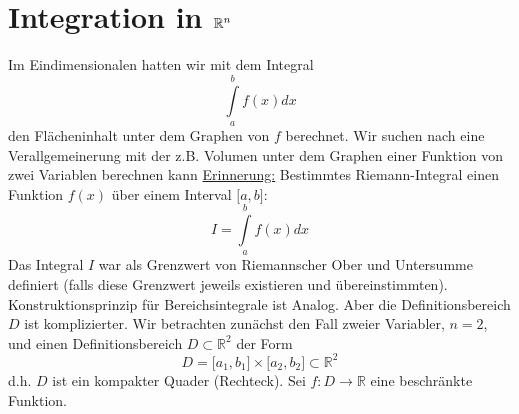 \chapter{Integration in $\mathbb{R}^{\lowercase{n}}$}
Im Eindimensionalen hatten wir mit dem Integral \[\int\limits_a^b f(x)dx\] den Flächeninhalt unter dem Graphen von $f$ berechnet. Wir suchen nach eine Verallgemeinerung mit der  z.B. Volumen unter dem Graphen einer Funktion von zwei Variablen berechnen kann
\underline{Erinnerung:} Bestimmtes Riemann-Integral einen Funktion $f(x)$ über einem Interval $\lbrack a,b\rbrack:$ 
\[I=\int\limits_a^b f(x)dx\] Das Integral $I$ war als Grenzwert von Riemannscher Ober und Untersumme definiert (falls diese Grenzwert jeweils existieren und übereinstimmten).\\

Konstruktionsprinzip für Bereichsintegrale ist Analog. Aber die Definitionsbereich $D$ ist komplizierter. Wir betrachten zunächst den Fall zweier Variabler, $n=2$, und einen Definitionsbereich $D\subset\mathbb{R}^2$ der Form
\[D=\lbrack a_1,b_1\rbrack\times\lbrack a_2,b_2\rbrack\subset\mathbb{R}^2\]
d.h. $D$ ist ein kompakter Quader (Rechteck). Sei $f:D\to\mathbb{R}$ eine beschränkte Funktion.


